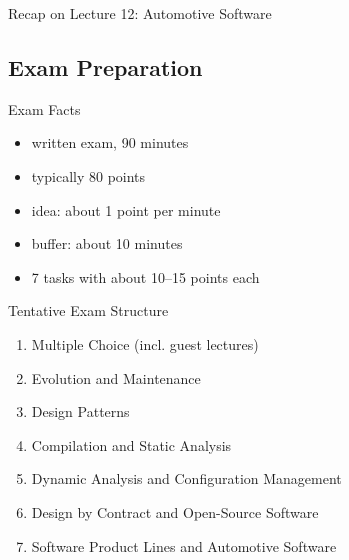 \begin{frame}{Recap on Lecture 12: Automotive Software} %
	\begin{fancycolumns}[columns=3,widths={5,90,5},animation=none]
		\nextcolumn
		\nextcolumn
	\end{fancycolumns}
\end{frame}

\subsection{Exam Preparation}
\begin{frame}{\insertsubsection}
	\begin{fancycolumns}[widths={45}]
		\begin{definition}{Exam Facts}
			\begin{itemize}
				\item written exam, 90 minutes
				\item typically 80 points
				\item idea: about 1 point per minute
				\item buffer: about 10 minutes
				\item 7 tasks with about 10--15 points each
			\end{itemize}
		\end{definition}
	\nextcolumn
		\begin{definition}{Tentative Exam Structure}
			\begin{enumerate}
				\item Multiple Choice (incl. guest lectures)
				\item Evolution and Maintenance
				\item Design Patterns
				\item Compilation and Static Analysis
				\item Dynamic Analysis and Configuration Management
				\item Design by Contract and Open-Source Software
				\item Software Product Lines and Automotive Software
			\end{enumerate}
		\end{definition}
	\end{fancycolumns}
\end{frame}

